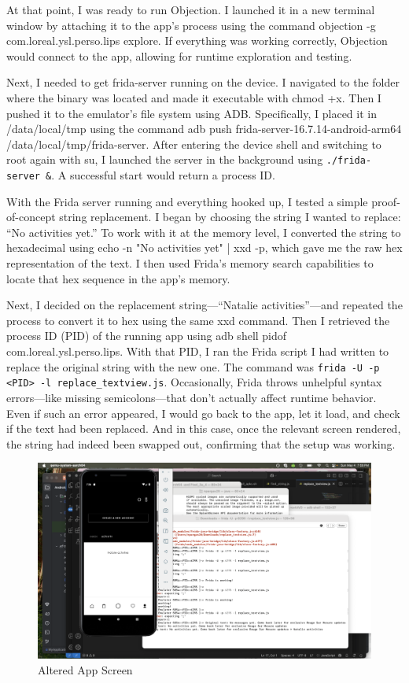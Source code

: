 At that point, I was ready to run Objection. I launched it in a new terminal window by attaching it to the app’s process using the command objection -g com.loreal.ysl.perso.lips explore. If everything was working correctly, Objection would connect to the app, allowing for runtime exploration and testing.

Next, I needed to get frida-server running on the device. I navigated to the folder where the binary was located and made it executable with chmod +x. Then I pushed it to the emulator’s file system using ADB. Specifically, I placed it in /data/local/tmp using the command adb push frida-server-16.7.14-android-arm64 /data/local/tmp/frida-server. After entering the device shell and switching to root again with su, I launched the server in the background using \texttt{./frida-server \&}. A successful start would return a process ID.

With the Frida server running and everything hooked up, I tested a simple proof-of-concept string replacement. I began by choosing the string I wanted to replace: “No activities yet.” To work with it at the memory level, I converted the string to hexadecimal using echo -n "No activities yet" | xxd -p, which gave me the raw hex representation of the text. I then used Frida’s memory search capabilities to locate that hex sequence in the app’s memory.

Next, I decided on the replacement string—“Natalie activities”—and repeated the process to convert it to hex using the same xxd command. Then I retrieved the process ID (PID) of the running app using adb shell pidof com.loreal.ysl.perso.lips. With that PID, I ran the Frida script I had written to replace the original string with the new one. The command was \texttt{frida -U -p <PID> -l replace\_textview.js}. Occasionally, Frida throws unhelpful syntax errors—like missing semicolons—that don’t actually affect runtime behavior. Even if such an error appeared, I would go back to the app, let it load, and check if the text had been replaced. And in this case, once the relevant screen rendered, the string had indeed been swapped out, confirming that the setup was working.
\begin{figure}[H]
	\centering
	\includegraphics[scale=.15]{Natalie_activities}
	\caption{Altered App Screen}
	\label{fig:natalieactivities}
\end{figure}
